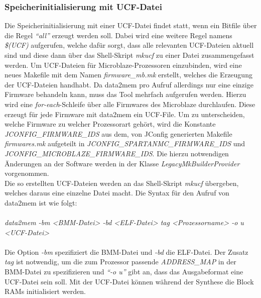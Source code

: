 \subsubsection{Speicherinitialisierung mit UCF-Datei}
Die Speicherinitialisierung mit einer UCF-Datei findet statt, wenn ein Bitfile über die Regel \textit{``all''} erzeugt werden soll. Dabei wird eine weitere Regel namens \textit{\$(UCF)} aufgerufen, welche dafür sorgt, dass alle relevanten UCF-Dateien aktuell sind und diese dann über das Shell-Skript \textit{mkucf} zu einer Datei zusammengefasst werden. Um UCF-Dateien für Microblaze-Prozessoren einzubinden, wird eine neues Makefile mit dem Namen \textit{firmware\_mb.mk} erstellt, welches die Erzeugung der UCF-Dateien handhabt. Da data2mem pro Aufruf allerdings nur eine einzige Firmware behandeln kann, muss das Tool mehrfach aufgerufen werden. Hierzu wird eine \textit{for-each}-Schleife über alle Firmwares des Microblaze durchlaufen. Diese erzeugt für jede Firmware mit data2mem ein UCF-File. Um zu unterscheiden, welche Firmware zu welcher Prozessorart gehört, wird die Konstante \textit{JCONFIG\_FIRMWARE\_IDS} aus dem, von JConfig generierten Makefile \textit{firmwares.mk} aufgeteilt in \textit{JCONFIG\_SPARTANMC\_FIRMWARE\_IDS} und \textit{JCONFIG\_MICROBLAZE\_FIRMWARE\_IDS}. Die hierzu notwendigen Änderungen an der Software werden in der Klasse \textit{LegacyMkBuilderProvider} vorgenommen.\\
Die so erstellten UCF-Dateien werden an das Shell-Skript \textit{mkucf} übergeben, welches daraus eine einzelne Datei macht. Die Syntax für den Aufruf von data2mem ist wie folgt:\\\\
\indent
\textit{data2mem -bm <BMM-Datei> -bd <ELF-Datei> tag <Prozessorname> -o u <UCF-Datei>}\\\\
Die Option \textit{-bm} spezifiziert die BMM-Datei und \textit{-bd} die ELF-Datei. Der Zusatz \textit{tag} ist notwendig, um die zum Prozessor passende \textit{ADDRESS\_MAP} in der BMM-Datei zu spezifizieren und \textit{``-o u''} gibt an, dass das Ausgabeformat eine UCF-Datei sein soll. Mit der UCF-Datei können während der Synthese die Block RAMs initialisiert werden.
